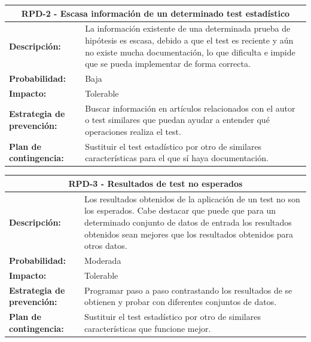 \begin{table}[H]
	\begin{tabular}{| p{4cm}| p{10cm} |}
		\hline
		\multicolumn{2}{|c|}{\textbf{RPD-2} - Escasa información de un determinado test estadístico} \\ \hline
		\textbf{Descripción:} & La información existente de una determinada prueba de hipótesis es escasa, debido a que el test es reciente y aún no existe mucha documentación, lo que dificulta e impide que se pueda implementar de forma correcta. \\ \hline
		\textbf{Probabilidad:} & Baja \\ \hline
		\textbf{Impacto:} & Tolerable \\ \hline
		\textbf{Estrategia de prevención:} & Buscar información en artículos relacionados con el autor o test similares que puedan ayudar a entender qué operaciones realiza el test. \\ \hline
		\textbf{Plan de contingencia:} & Sustituir el test estadístico por otro de similares características para el que sí haya documentación. \\ \hline
	\end{tabular}
\end{table}

\begin{table}[H]
	\begin{tabular}{| p{4cm}| p{10cm} |}
		\hline
		\multicolumn{2}{|c|}{\textbf{RPD-3} - Resultados de test no esperados} \\ \hline
		\textbf{Descripción:} & Los resultados obtenidos de la aplicación de un test no son los esperados. Cabe destacar que puede que para un determinado conjunto de datos de entrada los resultados obtenidos sean mejores que los resultados obtenidos para otros datos. \\ \hline
		\textbf{Probabilidad:} & Moderada \\ \hline
		\textbf{Impacto:} & Tolerable \\ \hline
		\textbf{Estrategia de prevención:} & Programar paso a paso contrastando los resultados de se obtienen y probar con diferentes conjuntos de datos. \\ \hline
		\textbf{Plan de contingencia:} & Sustituir el test estadístico por otro de similares características que funcione mejor. \\ \hline
	\end{tabular}
\end{table}

